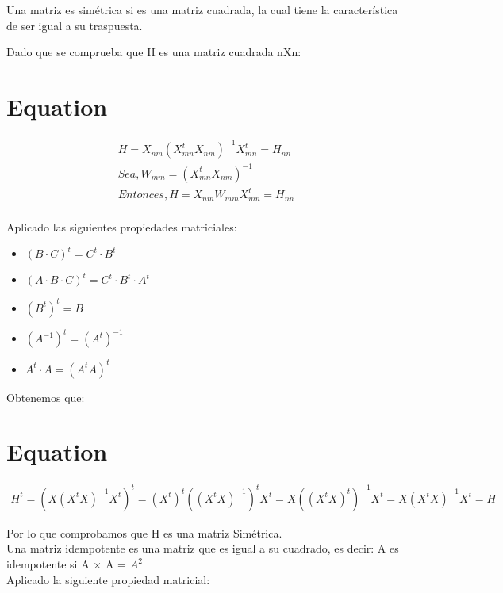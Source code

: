 \documentclass[12pt,spanish]{article}
\begin{document}
	Una matriz es simétrica si es una matriz cuadrada, la cual tiene la característica de ser igual a su traspuesta.
	
	Dado que se comprueba que H es una matriz cuadrada nXn:
	\section*{Equation}			
	\begin{equation}
	\begin{aligned}
	H =  X_{nm} (X_{mn}^t X_{nm})^{-1}  X_{mn}^t = H_{nn}\\
	Sea,  W_{mm} =  (X_{mn}^t X_{nm})^{-1}\\
	Entonces,  H =  X_{nm} W_{mm}   X_{mn}^t = H_{nn}
	\end{aligned}
	\end{equation}
\\
		 Aplicado las siguientes propiedades matriciales:
	 	\begin{itemize}
	 	\item $(B\cdot C)^t = C^t\cdot  B^t$
	 	\item $(A\cdot B\cdot C)^t=C^t\cdot  B^t\cdot  A^t$
	 	\item $(B^t)^t= B$ 
	    \item $(A^{-1})^t=(A^t)^{-1} $ 
	    \item $ A^t\cdot A=(A^tA)^t$
	 \end{itemize}

    Obtenemos que:\\
    
	\section*{Equation}			
	\begin{equation}
	\begin{aligned}
	H^t =  (X (X^t X)^{-1}  X^t)^t = (X^t)^t ((X^t X)^{-1})^t  X^t = X ((X^t X)^t)^{-1}  X^t = X (X^t X)^{-1}  X^t = H
 	\end{aligned}
	\end{equation}

	Por lo que comprobamos que H es una matriz Simétrica.\\
	

	Una matriz idempotente es una matriz que es igual a su cuadrado, es decir: A es idempotente si A × A =  $A^2$\\
	
		 Aplicado la siguiente propiedad matricial:
\end{document}
